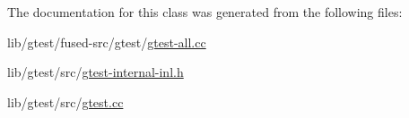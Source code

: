 The documentation for this class was generated from the following files\-:\begin{DoxyCompactItemize}
\item 
lib/gtest/fused-\/src/gtest/\hyperlink{fused-src_2gtest_2gtest-all_8cc}{gtest-\/all.\-cc}\item 
lib/gtest/src/\hyperlink{gtest-internal-inl_8h}{gtest-\/internal-\/inl.\-h}\item 
lib/gtest/src/\hyperlink{gtest_8cc}{gtest.\-cc}\end{DoxyCompactItemize}
